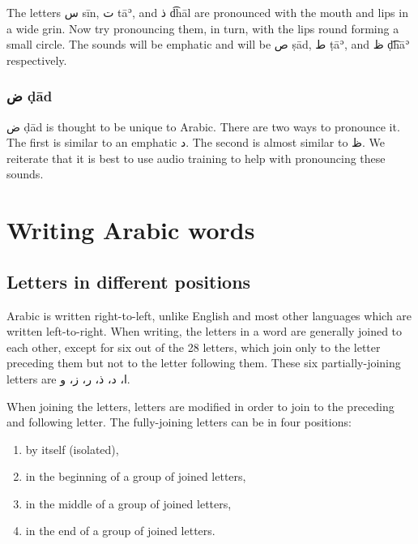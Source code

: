 \documentclass[
  10pt,
]{book}
\providecommand{\tightlist}{%
  \setlength{\itemsep}{0pt}\setlength{\parskip}{0pt}}
\begin{document}
The letters \foreignlanguage{arabic}{س} sīn, \foreignlanguage{arabic}{ت} tāʾ, and \foreignlanguage{arabic}{ذ} d͡hāl are pronounced with the mouth and lips in a wide grin. Now try pronouncing them, in turn, with the lips round forming a small circle. The sounds will be emphatic and will be \foreignlanguage{arabic}{ص} ṣād, \foreignlanguage{arabic}{ط} ṭāʾ, and \foreignlanguage{arabic}{ظ} ḍ͡hāʾ respectively.

\subsubsection{\texorpdfstring{\foreignlanguage{arabic}{ض} ḍād}{ض ḍād}}\label{ux636-dad}

\foreignlanguage{arabic}{ض} ḍād is thought to be unique to Arabic. There are two ways to pronounce it. The first is similar to an emphatic \foreignlanguage{arabic}{د}. The second is almost similar to \foreignlanguage{arabic}{ظ}. We reiterate that it is best to use audio training to help with pronouncing these sounds.

\section{Writing Arabic words}\label{writing-arabic-words}

\subsection{Letters in different positions}\label{letters-in-different-positions}

Arabic is written right-to-left, unlike English and most other languages which are written left-to-right. When writing, the letters in a word are generally joined to each other, except for six out of the 28 letters, which join only to the letter preceding them but not to the letter following them. These six partially-joining letters are \foreignlanguage{arabic}{ا، د، ذ، ر، ز، و}.

When joining the letters, letters are modified in order to join to the preceding and following letter. The fully-joining letters can be in four positions:

\begin{enumerate}
\def\labelenumi{\arabic{enumi}.}
\tightlist
\item
  by itself (isolated),
\item
  in the beginning of a group of joined letters,
\item
  in the middle of a group of joined letters,
\item
  in the end of a group of joined letters.
\end{enumerate}
\end{document}
